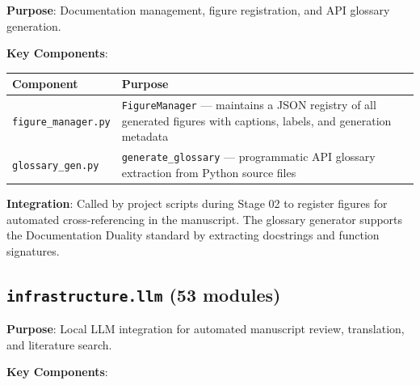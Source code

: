 \documentclass[
]{article}
\newcounter{none} %
\begin{document}
\textbf{Purpose}: Documentation management, figure registration, and API
glossary generation.

\textbf{Key Components}:

{\def\LTcaptype{none} %
\begin{longtable}[]{@{}
  >{\raggedright\arraybackslash}p{}
  >{\raggedright\arraybackslash}p{}@{}}
\toprule\noalign{}
\begin{minipage}[b]{\linewidth}\raggedright
Component
\end{minipage} & \begin{minipage}[b]{\linewidth}\raggedright
Purpose
\end{minipage} \\
\midrule\noalign{}
\endhead
\bottomrule\noalign{}
\endlastfoot
\texttt{figure\_manager.py} & \texttt{FigureManager} --- maintains a
JSON registry of all generated figures with captions, labels, and
generation metadata \\
\texttt{glossary\_gen.py} & \texttt{generate\_glossary} --- programmatic
API glossary extraction from Python source files \\
\end{longtable}
}

\textbf{Integration}: Called by project scripts during Stage 02 to
register figures for automated cross-referencing in the manuscript. The
glossary generator supports the Documentation Duality standard by
extracting docstrings and function signatures.

\subsection{\texorpdfstring{\texttt{infrastructure.llm} (53
modules)}{infrastructure.llm (53 modules)}}\label{infrastructure.llm-53-modules}

\textbf{Purpose}: Local LLM integration for automated manuscript review,
translation, and literature search.

\textbf{Key Components}:
\end{document}
